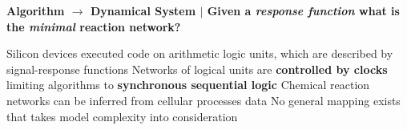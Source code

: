 \documentclass[a0,portrait]{a0poster}
\begin{document}


\vspace{-9cm}
\begin{tcolorbox}[boxrule=2pt,arc=3.4pt,boxsep=2mm]
	\begin{center}
		\textbf{\color{Grey}Algorithm $\rightarrow$ Dynamical System \color{Black}$|$
		Given a \textit{response function} what is the \textit{minimal} reaction network?}
	\end{center}
\end{tcolorbox}

\begin{itemize}[leftmargin=3cm]
	\up Silicon devices executed code on arithmetic logic units, which are
	described by signal-response functions
	\down Networks of logical units are \textbf{controlled by clocks} limiting algorithms to
	\textbf{synchronous sequential logic}
	\up Chemical reaction networks can be inferred from cellular processes
	data \cite{Galagali2016BayesianNetworks}
	\down No general mapping exists that takes model complexity into consideration
\end{itemize}
\end{document}
